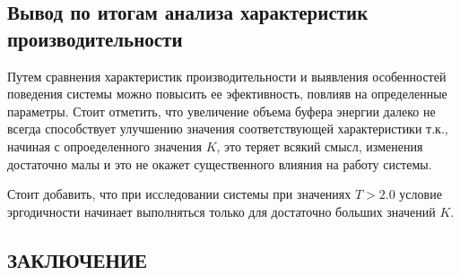 \documentclass[12pt, a4paper]{article}
\begin{document}
\begin{figure}[h]
\end{figure}
\pagebreak
\begin{flushleft}\subsection{Вывод по итогам анализа характеристик производительности}\end{flushleft}

Путем сравнения характеристик производительности и выявления особенностей поведения системы можно повысить ее эфективность, повлияв на определенные параметры. Стоит отметить, что увеличение объема буфера энергии далеко не всегда способствует улучшению значения соответствующей характеристики т.к., начиная с опроеделенного значения $K$, это теряет всякий смысл, изменения достаточно малы и это не окажет существенного влияния на работу системы.

Стоит добавить, что при исследовании системы при значениях $T > 2.0$ условие эргодичности начинает выполняться только для достаточно больших значений $K$.

\pagebreak
\begin{center}
	\section*{ЗАКЛЮЧЕНИЕ}
\end{center}
\end{document}
